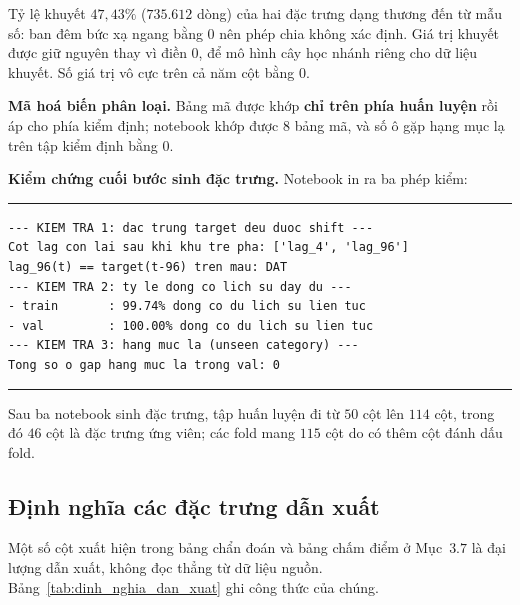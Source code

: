\documentclass[12pt,a4paper]{article}
\renewcommand{\baselinestretch}{1.35}
\begin{document}
Tỷ lệ khuyết $47{,}43\%$ ($735.612$ dòng) của hai đặc trưng dạng thương đến từ mẫu số: ban
đêm bức xạ ngang bằng $0$ nên phép chia không xác định. Giá trị khuyết được giữ nguyên thay
vì điền $0$, để mô hình cây học nhánh riêng cho dữ liệu khuyết. Số giá trị vô cực trên cả
năm cột bằng $0$.

\textbf{Mã hoá biến phân loại.} Bảng mã được khớp \textbf{chỉ trên phía huấn luyện} rồi áp
cho phía kiểm định; notebook khớp được $8$ bảng mã, và số ô gặp hạng mục lạ trên tập kiểm
định bằng $0$.

\textbf{Kiểm chứng cuối bước sinh đặc trưng.} Notebook in ra ba phép kiểm:

\begingroup
\par\vspace{6pt}\hrule\vspace{4pt}
\small\renewcommand{\baselinestretch}{1.0}\selectfont
\begin{verbatim}
--- KIEM TRA 1: dac trung target deu duoc shift ---
Cot lag con lai sau khi khu tre pha: ['lag_4', 'lag_96']
lag_96(t) == target(t-96) tren mau: DAT
--- KIEM TRA 2: ty le dong co lich su day du ---
- train       : 99.74% dong co du lich su lien tuc
- val         : 100.00% dong co du lich su lien tuc
--- KIEM TRA 3: hang muc la (unseen category) ---
Tong so o gap hang muc la trong val: 0
\end{verbatim}
\vspace{2pt}\hrule\par\vspace{6pt}
\endgroup

Sau ba notebook sinh đặc trưng, tập huấn luyện đi từ $50$ cột lên $114$ cột, trong đó $46$
cột là đặc trưng ứng viên; các fold mang $115$ cột do có thêm cột đánh dấu fold.

\subsection{Định nghĩa các đặc trưng dẫn xuất}

Một số cột xuất hiện trong bảng chẩn đoán và bảng chấm điểm ở Mục~$3.7$ là đại lượng dẫn xuất,
không đọc thẳng từ dữ liệu nguồn. Bảng~\ref{tab:dinh_nghia_dan_xuat} ghi công thức của chúng.
\end{document}
